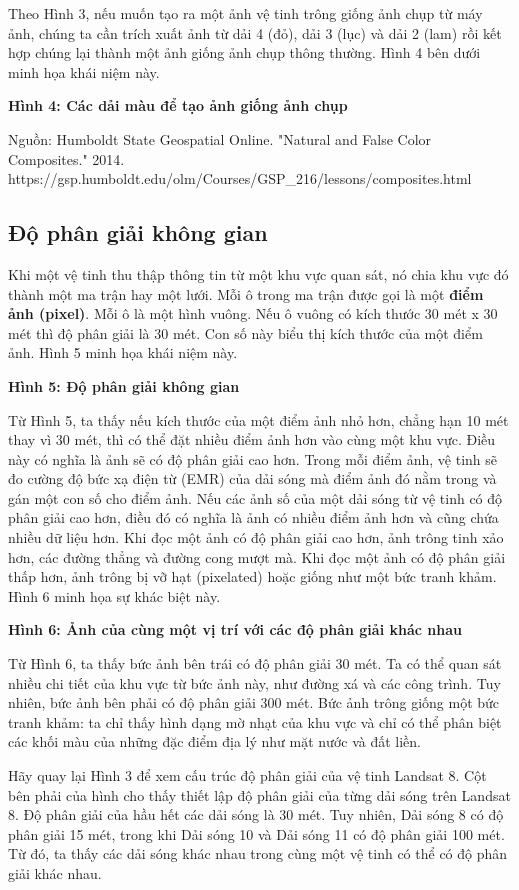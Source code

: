 Theo Hình 3, nếu muốn tạo ra một ảnh vệ tinh trông giống ảnh chụp từ máy ảnh, chúng ta cần trích xuất ảnh từ dải 4 (đỏ), dải 3 (lục) và dải 2 (lam) rồi kết hợp chúng lại thành một ảnh giống ảnh chụp thông thường. Hình 4 bên dưới minh họa khái niệm này.

\textbf{Hình 4: Các dải màu để tạo ảnh giống ảnh chụp}

Nguồn: Humboldt State Geospatial Online. "Natural and False Color Composites." 2014. https://gsp.humboldt.edu/olm/Courses/GSP\_216/lessons/composites.html

\subsection{Độ phân giải không gian}

Khi một vệ tinh thu thập thông tin từ một khu vực quan sát, nó chia khu vực đó thành một ma trận hay một lưới. Mỗi ô trong ma trận được gọi là một \textbf{điểm ảnh (pixel)}. Mỗi ô là một hình vuông. Nếu ô vuông có kích thước 30 mét x 30 mét thì độ phân giải là 30 mét. Con số này biểu thị kích thước của một điểm ảnh. Hình 5 minh họa khái niệm này.

\textbf{Hình 5: Độ phân giải không gian}

Từ Hình 5, ta thấy nếu kích thước của một điểm ảnh nhỏ hơn, chẳng hạn 10 mét thay vì 30 mét, thì có thể đặt nhiều điểm ảnh hơn vào cùng một khu vực. Điều này có nghĩa là ảnh sẽ có độ phân giải cao hơn. Trong mỗi điểm ảnh, vệ tinh sẽ đo cường độ bức xạ điện từ (EMR) của dải sóng mà điểm ảnh đó nằm trong và gán một con số cho điểm ảnh. Nếu các ảnh số của một dải sóng từ vệ tinh có độ phân giải cao hơn, điều đó có nghĩa là ảnh có nhiều điểm ảnh hơn và cũng chứa nhiều dữ liệu hơn. Khi đọc một ảnh có độ phân giải cao hơn, ảnh trông tinh xảo hơn, các đường thẳng và đường cong mượt mà. Khi đọc một ảnh có độ phân giải thấp hơn, ảnh trông bị vỡ hạt (pixelated) hoặc giống như một bức tranh khảm. Hình 6 minh họa sự khác biệt này.

\textbf{Hình 6: Ảnh của cùng một vị trí với các độ phân giải khác nhau}

Từ Hình 6, ta thấy bức ảnh bên trái có độ phân giải 30 mét. Ta có thể quan sát nhiều chi tiết của khu vực từ bức ảnh này, như đường xá và các công trình. Tuy nhiên, bức ảnh bên phải có độ phân giải 300 mét. Bức ảnh trông giống một bức tranh khảm: ta chỉ thấy hình dạng mờ nhạt của khu vực và chỉ có thể phân biệt các khối màu của những đặc điểm địa lý như mặt nước và đất liền.

Hãy quay lại Hình 3 để xem cấu trúc độ phân giải của vệ tinh Landsat 8. Cột bên phải của hình cho thấy thiết lập độ phân giải của từng dải sóng trên Landsat 8. Độ phân giải của hầu hết các dải sóng là 30 mét. Tuy nhiên, Dải sóng 8 có độ phân giải 15 mét, trong khi Dải sóng 10 và Dải sóng 11 có độ phân giải 100 mét. Từ đó, ta thấy các dải sóng khác nhau trong cùng một vệ tinh có thể có độ phân giải khác nhau.

